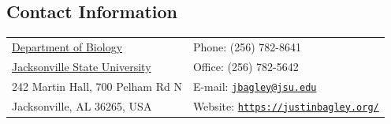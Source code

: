 \documentclass[margin,line]{res}
\begin{document}
\begin{resume}



\section{\sc Contact Information}
\vspace{.05in}
\begin{tabular}{@{}p{2.75in}p{2in}}
\href{http://www.jsu.edu/biology/}{Department of Biology} & Phone: (256) 782-8641 \\
\href{http://www.jsu.edu}{Jacksonville State University} & Office: (256) 782-5642 \\
242 Martin Hall, 700 Pelham Rd N & E-mail: \href{mailto:jbagley@jsu.edu}{\tt jbagley@jsu.edu} \\
Jacksonville, AL 36265, USA & Website: \href{https://justinbagley.org/}{\tt https://justinbagley.org/} 
\end{tabular}






\end{resume}
\end{document}
